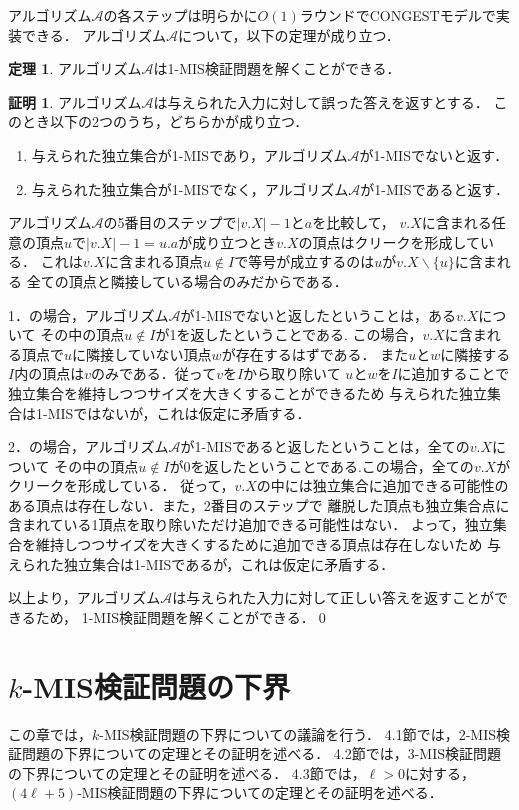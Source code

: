 \documentclass[12pt]{thesis}
\newcommand{\CONGEST}{\textsf{CONGEST}}
\theoremstyle{definition}
\newtheorem{theorem}{定理}[chapter]
\newtheorem*{prf*}{証明}
\begin{document}
アルゴリズム$\mathcal{A}$の各ステップは明らかに$O(1)$ラウンドで{\CONGEST}モデルで実装できる．
アルゴリズム$\mathcal{A}$について，以下の定理が成り立つ．
\begin{theorem}
アルゴリズム$\mathcal{A}$は1-MIS検証問題を解くことができる．
\end{theorem}
\begin{prf*}
アルゴリズム$\mathcal{A}$は与えられた入力に対して誤った答えを返すとする．
このとき以下の2つのうち，どちらかが成り立つ． 
\begin{enumerate}
\item 与えられた独立集合が1-MISであり，アルゴリズム$\mathcal{A}$が1-MISでないと返す． 
\item 与えられた独立集合が1-MISでなく，アルゴリズム$\mathcal{A}$が1-MISであると返す． 
\end{enumerate}
アルゴリズム$\mathcal{A}$の5番目のステップで$|v.X| - 1$と$a$を比較して，
$v.X$に含まれる任意の頂点$u$で$|v.X| - 1 = u.a$が成り立つとき$v.X$の頂点はクリークを形成している．
これは$v.X$に含まれる頂点$u \notin I$で等号が成立するのは$u$が$v.X \backslash \{u\}$に含まれる
全ての頂点と隣接している場合のみだからである．

1．の場合，アルゴリズム$\mathcal{A}$が1-MISでないと返したということは，ある$v.X$について
その中の頂点$u \notin I$が1を返したということである.
この場合，$v.X$に含まれる頂点で$u$に隣接していない頂点$w$が存在するはずである．
また$u$と$w$に隣接する$I$内の頂点は$v$のみである．従って$v$を$I$から取り除いて
$u$と$w$を$I$に追加することで独立集合を維持しつつサイズを大きくすることができるため
与えられた独立集合は1-MISではないが，これは仮定に矛盾する． 

2．の場合，アルゴリズム$\mathcal{A}$が1-MISであると返したということは，全ての$v.X$について
その中の頂点$u \notin I$が0を返したということである.この場合，全ての$v.X$がクリークを形成している．
従って，$v.X$の中には独立集合に追加できる可能性のある頂点は存在しない．また，2番目のステップで
離脱した頂点も独立集合点に含まれている1頂点を取り除いただけ追加できる可能性はない．
よって，独立集合を維持しつつサイズを大きくするために追加できる頂点は存在しないため
与えられた独立集合は1-MISであるが，これは仮定に矛盾する． 

以上より，アルゴリズム$\mathcal{A}$は与えられた入力に対して正しい答えを返すことができるため，
1-MIS検証問題を解くことができる．\qed
\end{prf*}
\newpage

\chapter{$k$-MIS検証問題の下界}
この章では，$k$-MIS検証問題の下界についての議論を行う．
4.1節では，2-MIS検証問題の下界についての定理とその証明を述べる．
4.2節では，3-MIS検証問題の下界についての定理とその証明を述べる．
4.3節では，$\ell > 0$に対する，$(4\ell + 5)$-MIS検証問題の下界についての定理とその証明を述べる．
\end{document}
